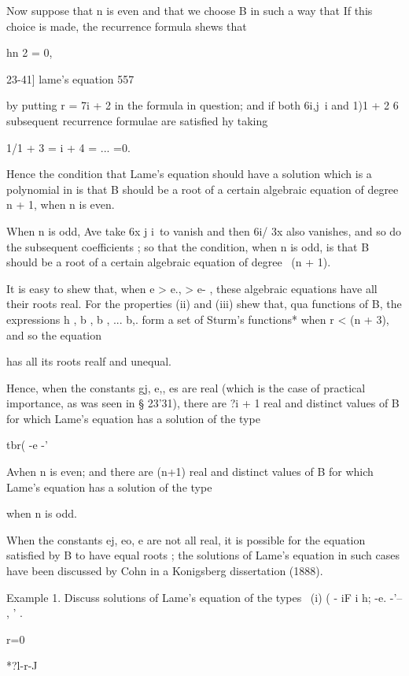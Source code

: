 {{{{Now suppose that n is even and that we choose B in such a way that 
If this choice is made, the recurrence formula shews that 

hn  2 = 0, 



23-41] lame's equation 557 

by putting r =  7i + 2 in the formula in question; and if both 6i,j\  i and 
 1)1 + 2  6      subsequent recurrence formulae are satisfied hy taking 

 1/1 + 3 =  i  + 4 = ... =0. 

Hence the condition that Lame's equation should have a solution which 
is a polynomial in   is that B should be a root of a certain algebraic equation 
of degree  n + 1, when n is even. 

When n is odd, Ave take 6x j i\ to vanish and then 6i/  3x also vanishes, 
and so do the subsequent coefficients ; so that the condition, when n is odd, is 
that B should be a root of a certain algebraic equation of degree \ (n + 1). 

It is easy to shew that, when e  > e., > e- , these algebraic equations have 
all their roots real. For the properties (ii) and (iii) shew that, qua functions 
of B, the expressions h , b , b , ... b,. form a set of Sturm's functions* when 
r <   (n + 3), and so the equation 

has all its roots realf and unequal. 

Hence, when the constants gj, e,, es are real (which is the case of practical 
importance, as was seen in § 23'31), there are  ?i + 1 real and distinct values 
of B for which Lame's equation has a solution of the type 

tbr( -e -' 

Avhen n is even; and there are  (n+1) real and distinct values of B for 
which Lame's equation has a solution of the type 

when n is odd. 

When the constants ej, eo, e  are not all real, it is possible for the equation satisfied 
by B to have equal roots ; the solutions of Lame's equation in such cases have been 
discussed by Cohn in a Konigsberg dissertation (1888). 

Example 1. Discuss solutions of Lame's equation of the types 
\   (i) ( - iF i h;  -e.  -'-- , ' . 

r=0 



*?l-r-J 



}}}}
